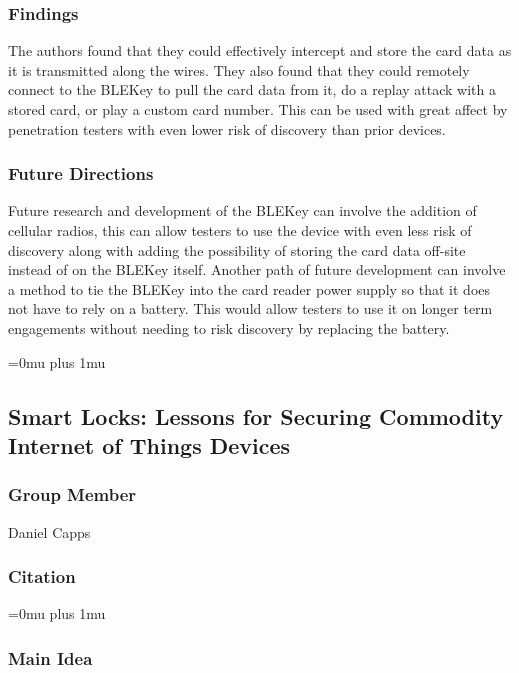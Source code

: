 \subsubsection{Findings}

\noindent
The authors found that they could effectively intercept and store the card data as it is transmitted along the wires.  They also found that they could remotely connect to the BLEKey to pull the card data from it, do a replay attack with a stored card, or play a custom card number.  This can be used with great affect by penetration testers with even lower risk of discovery than prior devices.

\subsubsection{Future Directions}

\noindent
Future research and development of the BLEKey can involve the addition of cellular radios, this can allow testers to use the device with even less risk of discovery along with adding the possibility of storing the card data off-site instead of on the BLEKey itself.  Another path of future development can involve a method to tie the BLEKey into the card reader power supply so that it does not have to rely on a battery.  This would allow testers to use it on longer term engagements without needing to risk discovery by replacing the battery.

\Urlmuskip=0mu plus 1mu\relax

\subsection{{S}mart {L}ocks: {L}essons for {S}ecuring {C}ommodity {I}nternet of  {T}hings  {D}evices}

\subsubsection{Group Member}

\noindent
Daniel Capps

\noindent
\subsubsection{Citation}

\Urlmuskip=0mu plus 1mu\relax


\subsubsection{Main Idea}

